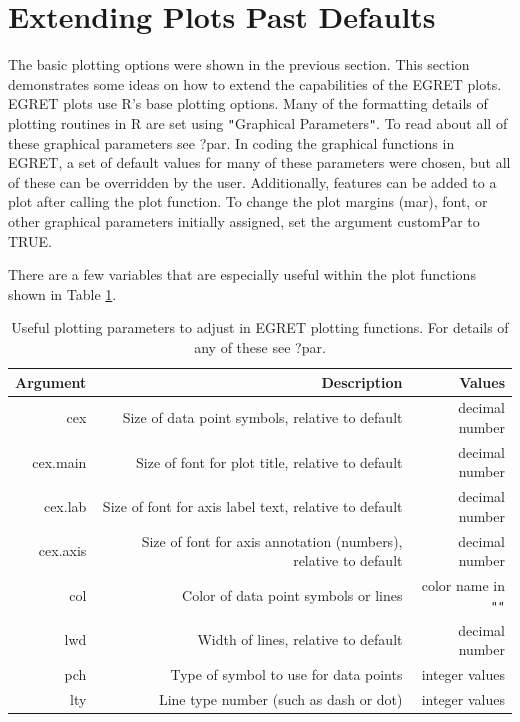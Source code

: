 \documentclass[a4paper,11pt]{article}\usepackage[]{graphicx}\usepackage[]{color}
\begin{document}
\clearpage

\FloatBarrier


\section{Extending Plots Past Defaults}
\label{sec:extendedPlots}

\FloatBarrier

The basic plotting options were shown in the previous section.  This section demonstrates some ideas on how to extend the capabilities of the EGRET plots. EGRET plots use R's base plotting options. Many of the formatting details of plotting routines in R are set using \texttt{"}Graphical Parameters\texttt{"}.  To read about all of these graphical parameters see ?par.  In coding the graphical functions in EGRET, a set of default values for many of these parameters were chosen, but all of these can be overridden by the user. Additionally, features can be added to a plot after calling the plot function. To change the plot margins (mar), font, or other graphical parameters initially assigned, set the argument customPar to TRUE.

There are a few variables that are especially useful within the plot functions shown in Table \ref{table:tableChangeSingle}.

\begin{table}[ht]
\centering
\begin{tabular}{rrr}
  \hline
Argument & Description & Values  \\ 
  \hline
cex &  Size of data point symbols, relative to default & decimal number \\ 
cex.main & Size of font for plot title, relative to default & decimal number \\ 
cex.lab &  Size of font for axis label text, relative to default & decimal number \\ 
cex.axis & Size of font for axis annotation (numbers), relative to default & decimal number\\
col & Color of data point symbols or lines & color name in \texttt{"}\texttt{"} \\
lwd & Width of lines, relative to default & decimal number\\
pch & Type of symbol to use for data points & integer values\\
lty & Line type number (such as dash or dot) & integer values\\
   \hline
\end{tabular}
\caption{Useful plotting parameters to adjust in EGRET plotting functions.  For details of any of these see ?par.} 
\label{table:tableChangeSingle}
\end{table}
\end{document}
